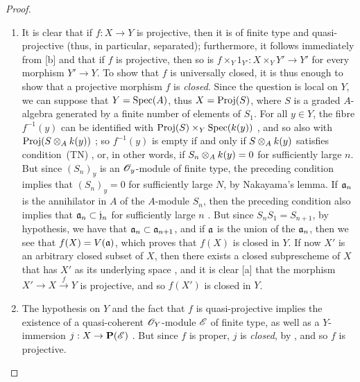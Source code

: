 \begin{proof}
\label{proof-2.5.5.3}
\medskip\noindent
\begin{enumerate}[label=\emph{(\roman*)}]
  \item It is clear that if $f:X\to Y$ is projective, then it is of finite type and quasi-projective (thus, in particular, separated); furthermore, it follows immediately from [b] and  that if $f$ is projective, then so is $f\times_Y 1_{Y'}:X\times_Y Y'\to Y'$ for every morphism $Y'\to Y$.
     To show that $f$ is universally closed, it is thus enough to show that a projective morphism $f$ is \emph{closed}.
     Since the question is local on $Y$, we can suppose that $Y={\mathop{\mathrm{Spec}}\nolimits}(A)$, thus  $X={\mathop{\mathrm{Proj}}\nolimits}(S)$, where $S$ is a graded $A$-algebra generated by a finite number of elements of $S_1$.
     For all $y\in Y$, the fibre $f^{-1}(y)$ can be identified with ${\mathop{\mathrm{Proj}}\nolimits}(S)\times_Y{\mathop{\mathrm{Spec}}\nolimits}(k(y))$ , and so also with ${\mathop{\mathrm{Proj}}\nolimits}(S\otimes_Ak(y))$ ;
     so $f^{-1}(y)$ is empty if and only if $S\otimes_Ak(y)$ satisfies condition~(TN) , or, in other words, if $S_n\otimes_Ak(y)=0$ for sufficiently large $n$.
     But since $(S_n)_y$ is an $\mathscr{O}_y$-module of finite type, the preceding condition implies that $(S_n)_y=0$ for sufficiently large $N$, by Nakayama's lemma.
     If $\mathfrak{a}_n$ is the annihilator in $A$ of the $A$-module $S_n$, then the preceding condition also implies that $\mathfrak{a}_n\subset\mathfrak{j}_n$ for sufficiently large $n$ .
     But since $S_nS_1=S_{n+1}$, by hypothesis, we have that $\mathfrak{a}_n\subset\mathfrak{a}_{n+1}$, and if $\mathfrak{a}$ is the union of the $\mathfrak{a}_n$, then we see that $f(X)=V(\mathfrak{a})$, which proves that $f(X)$ is closed in $Y$.
     If now $X'$ is an arbitrary closed subset of $X$, then there exists a closed subprescheme of $X$ that has $X'$ as its underlying space , and it is clear [a] that the morphism $X'\to X\xrightarrow{f}Y$ is projective, and so $f(X')$ is closed in $Y$.
   \item The hypothesis on $Y$ and the fact that $f$ is quasi-projective implies the existence of a quasi-coherent $\mathscr{O}_Y$-module $\mathscr{E}$ of finite type, as well as a $Y$-immersion $j:X\to\bb{P}(\sh{E})$ .
      But since $f$ is proper, $j$ is \emph{closed}, by , and so $f$ is projective.
\end{enumerate}
\end{proof}

